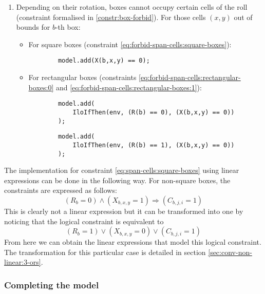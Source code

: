 \begin{enumerate}
	\item Depending on their rotation, boxes cannot occupy certain cells of the
	roll (constraint formalised in \ref{constr:box-forbid}). For those cells $(x,y)$
	out of bounds for $b$-th box:
    
	\begin{itemize}
		\item For square boxes (constraint \ref{eq:forbid-span-cells:square-boxes}):
		{\NOINDENT \begin{lstlisting}
		model.add(X(b,x,y) == 0);
		\end{lstlisting}}
		
		\item For rectangular boxes (constraints \ref{eq:forbid-span-cells:rectangular-boxes:0}
		and \ref{eq:forbid-span-cells:rectangular-boxes:1}):
		{\NOINDENT \begin{lstlisting}
		model.add(
			IloIfThen(env, (R(b) == 0), (X(b,x,y) == 0))
		);
		\end{lstlisting}}
		{\NOINDENT \begin{lstlisting}
		model.add(
			IloIfThen(env, (R(b) == 1), (X(b,x,y) == 0))
		);
		\end{lstlisting}}
	\end{itemize}
    
\end{enumerate}

The implementation for constraint \ref{eq:span-cells:square-boxes} using linear
expressions can be done in the following way. For non-square boxes, the constraints
are expressed as follows:
\[
(R_b = 0) \wedge (X_{b,x,y} = 1) \Longrightarrow (C_{b,j,i} = 1)
\]
This is clearly not a linear expression but it can be transformed into one by noticing
that the logical constraint is equivalent to
\[
(R_b = 1) \vee (X_{b,x,y} = 0) \vee (C_{b,j,i} = 1)
\]
From here we can obtain the linear expressions that model this logical constraint.
The transformation for this particular case is detailed in section
\ref{sec:conv-non-linear:3-ors}.

\subsubsection{Completing the model}
\label{sec:linear-programming:implementation:completion}

